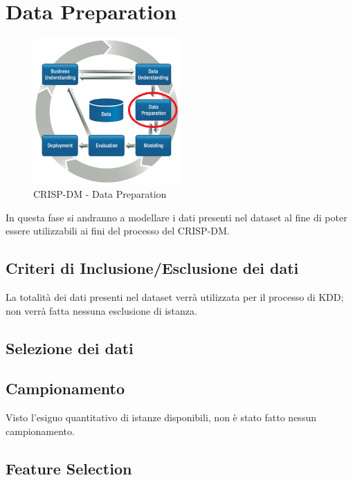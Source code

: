 \chapter{Data Preparation}

\begin{figure}[hbtp]
	\centering
	\includegraphics[width=0.5\textwidth]{./images/CRISPDM_3.png}
	\caption{CRISP-DM - Data Preparation}
	\label{CRISPDM_3}
\end{figure}

In questa fase si andranno a modellare i dati presenti nel dataset al fine di poter essere utilizzabili ai fini del processo del CRISP-DM.

\section{Criteri di Inclusione/Esclusione dei dati}

La totalità dei dati presenti nel dataset verrà utilizzata per il processo di KDD; non verrà fatta nessuna esclusione di istanza.

\section{Selezione dei dati}

\section{Campionamento}
Visto l'esiguo quantitativo di istanze disponibili, non è stato fatto nessun campionamento.

\section{Feature Selection}


